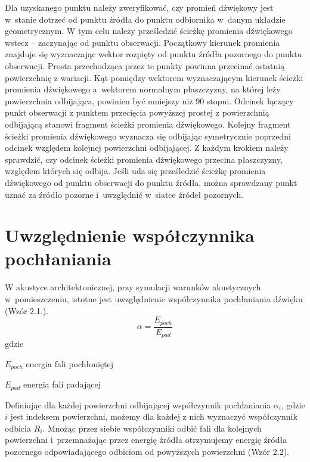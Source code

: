 Dla uzyskanego punktu należy zweryfikować, czy promień dźwiękowy jest w~stanie dotrzeć od punktu źródła do punktu odbiornika w~danym układzie geometrycznym. W tym celu należy prześledzić ścieżkę promienia dźwiękowego wstecz – zaczynając od punktu obserwacji. Początkowy kierunek promienia znajduje się wyznaczając wektor rozpięty od punktu źródła pozornego do punktu obserwacji. Prosta przechodząca przez te punkty powinna przecinać ostatnią powierzchnię z wariacji. Kąt pomiędzy wektorem wyznaczającym kierunek ścieżki promienia dźwiękowego a~wektorem normalnym płaszczyzny, na której leży powierzchnia odbijająca, powinien być mniejszy niż 90 stopni. Odcinek łączący punkt obserwacji z punktem przecięcia powyższej prostej z powierzchnią odbijającą stanowi fragment ścieżki promienia dźwiękowego. Kolejny fragment ścieżki promienia dźwiękowego wyznacza się odbijając symetrycznie poprzedni odcinek względem kolejnej powierzchni odbijającej. Z każdym krokiem należy sprawdzić, czy odcinek ścieżki promienia dźwiękowego przecina płaszczyzny, względem których się odbija. Jeśli uda się prześledzić ścieżkę promienia dźwiękowego od punktu obserwacji do punktu źródła, można sprawdzany punkt uznać za źródło pozorne i~uwzględnić w~siatce źródeł pozornych.


\section{Uwzględnienie współczynnika pochłaniania}\label{sec:zm}

W akustyce architektonicznej, przy symulacji warunków akustycznych w~pomieszczeniu, istotne jest uwzględnienie współczynnika pochłaniania dźwięku (Wzór 2.1.). \\

\begin{equation}
\alpha=\frac{E_{poch}}{E_{pad}}
\end{equation}
gdzie
\begin{eqwhere}[2cm]
        \item[$E_{poch}$] energia fali pochłoniętej
        \item[$E_{pad}$] energia fali padającej
\end{eqwhere}

Definiując dla każdej powierzchni odbijającej współczynnik pochłaniania $\alpha_i$, gdzie $i$  jest indeksem powierzchni, możemy dla każdej z nich wyznaczyć współczynnik odbicia $R_i$. Mnożąc przez siebie współczynniki odbić fali dla kolejnych powierzchni i~przemnażając przez energię źródła otrzymujemy energię źródła pozornego odpowiadającego odbiciom od powyższych powierzchni (Wzór 2.2). \\

